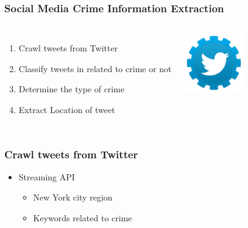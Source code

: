 \documentclass{beamer}
\begin{document}
    \begin{frame}
        \frametitle{Social Media Crime Information Extraction}
        \begin{columns}[c]
            \column{3in}
            \begin{enumerate} [<+->]
                \item Crawl tweets from Twitter
                \item Classify tweets in related to crime or not
                \item Determine the type of crime
                \item Extract Location of tweet
            \end{enumerate}
        
            \column{1in}
            \includegraphics[width=1in]{twitter}
        \end{columns}
    \end{frame}

    \begin{frame}
        \frametitle{Crawl tweets from Twitter}
        \begin{itemize}
            \item Streaming API
                \begin{itemize}
                    \item New York city region
                    \item Keywords related to crime
                \end{itemize}
        \end{itemize}
    \end{frame}
\end{document}
